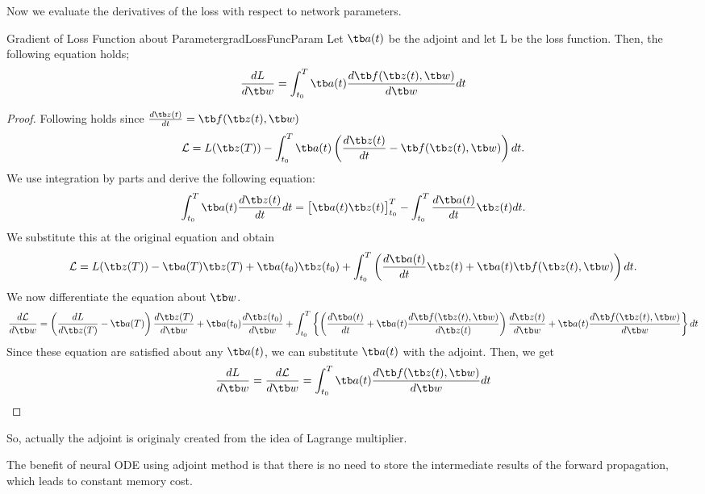\documentclass{article}
\begin{document}
        Now we evaluate the derivatives of the loss with respect to network parameters.
        \begin{thm}{Gradient of Loss Function about Parameter}{gradLossFuncParam}
            Let $\tb a(t)$ be the adjoint and let L be the loss function. Then, the following equation holds;
            \[\frac{dL}{d\tb w}=\int_{t_0}^{T}\tb a(t)\frac{d\tb f(\tb z(t), \tb w)}{d\tb w}dt\]
        \end{thm}
        \begin{proof}
            Following holds since $\frac{d\tb z(t)}{dt} = \tb f(\tb z(t), \tb w)$
            \[
            \mathcal{L} = L(\tb z(T)) - \int_{t_0}^{T}\tb a(t)\left( \frac{d\tb z(t)}{dt} - \tb f(\tb z(t), \tb w) \right)dt.
            \]
            We use integration by parts and derive the following equation:
            \[
            \int_{t_0}^{T}\tb a(t)\frac{d\tb z(t)}{dt}dt = \big[\tb a(t)\tb z(t)\big]_{t_0}^{T} - \int_{t_0}^{T}\frac{d\tb a(t)}{dt}\tb z(t)dt.
            \]
            We substitute this at the original equation and obtain
            \[
            \mathcal{L} = L(\tb z(T)) -\tb a(T)\tb z(T) + \tb a(t_0)\tb z(t_0)
            + \int_{t_0}^{T}\left( \frac{d\tb a(t)}{dt}\tb z(t) + \tb a(t)\tb f(\tb z(t),\tb w) \right)dt.
            \]
            We now differentiate the equation about $\tb w$.
            \[
            \frac{d\mathcal{L}}{d\tb w}=\left( \frac{dL}{d\tb z(T)} - \tb a(T)\right)\frac{d\tb z(T)}{d\tb w} + \tb a(t_0)\frac{d\tb z(t_0)}{d\tb w}
            + \int_{t_0}^{T}\left\{ \left( \frac{d\tb a(t)}{dt} + \tb a(t)\frac{d\tb f(\tb z(t),\tb w)}{d\tb z(t)} \right)\frac{d\tb z(t)}{d\tb w} + \tb a(t)\frac{d\tb f(\tb z(t),\tb w)}{d\tb w} \right\}dt
            \]
            Since these equation are satisfied about any $\tb a(t)$, we can substitute $\tb a(t)$ with the adjoint. Then, we get
            \[
            \frac{dL}{d\tb w}=\frac{d\mathcal{L}}{d\tb w}=\int_{t_0}^{T}\tb a(t)\frac{d\tb f(\tb z(t), \tb w)}{d\tb w}dt
            \]

        \end{proof}
        So, actually the adjoint is originaly created from the idea of Lagrange multiplier.

        The benefit of neural ODE using adjoint method is that there is no need to store the intermediate results of the forward propagation, which
        leads to constant memory cost.
        
\end{document}
